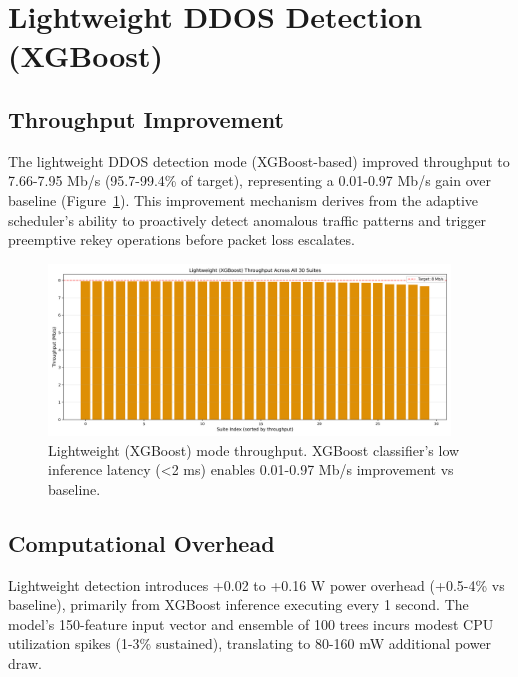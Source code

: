 \documentclass[11pt,a4paper]{article}
\begin{document}
\section{Lightweight DDOS Detection (XGBoost)}

\subsection{Throughput Improvement}

The lightweight DDOS detection mode (XGBoost-based) improved throughput to 7.66-7.95 Mb/s (95.7-99.4\% of target), representing a 0.01-0.97 Mb/s gain over baseline (Figure~\ref{fig:throughput_lightweight}). This improvement mechanism derives from the adaptive scheduler's ability to proactively detect anomalous traffic patterns and trigger preemptive rekey operations before packet loss escalates.

\begin{figure}[H]
\centering
\includegraphics[width=0.95\textwidth]{../figures/figure02_throughput_all_suites_lightweight.png}
\caption{Lightweight (XGBoost) mode throughput. XGBoost classifier's low inference latency (<2 ms) enables 0.01-0.97 Mb/s improvement vs baseline.}
\label{fig:throughput_lightweight}
\end{figure}

\subsection{Computational Overhead}

Lightweight detection introduces +0.02 to +0.16 W power overhead (+0.5-4\% vs baseline), primarily from XGBoost inference executing every 1 second. The model's 150-feature input vector and ensemble of 100 trees incurs modest CPU utilization spikes (1-3\% sustained), translating to 80-160 mW additional power draw.
\end{document}
